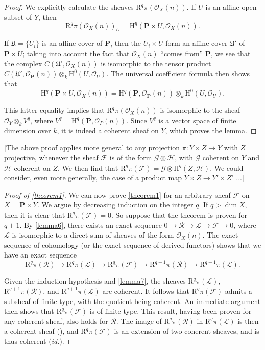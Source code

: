\documentclass{article}
\theoremstyle{plain}
\theoremstyle{definition}
\newcommand{\sh}{\mathscr}
\newcommand{\HH}{\mathrm{H}}
\newcommand{\RR}{\mathrm{R}}
\newcommand{\PP}{\mathbf{P}}
\newcommand{\oldpage}[1]{\marginpar{\footnotesize$\Big\vert$ \textit{p.~#1}}}
\begin{document}
\begin{proof}
  We explicitly calculate the sheaves $\RR^q\pi(\sh{O}_X(n))$.
  If $U$ is an affine open
  \oldpage{104}
  subset of $Y$, then
  \[
    \RR^q\pi(\sh{O}_X(n))_U = \HH^q(\PP\times U,\sh{O}_X(n)).
  \]

  If $\mathfrak{U}=\{U_i\}$ is an affine cover of $\PP$, then the $U_i\times U$ form an affine cover $\mathfrak{U}'$ of $\PP\times U$;
  taking into account the fact that $\sh{O}_X(n)$ ``comes from'' $\PP$, we see that the complex $C(\mathfrak{U}',\sh{O}_X(n))$ is isomorphic to the tensor product $C(\mathfrak{U}',\sh{O}_{\PP}(n))\otimes_k\HH^0(U,\sh{O}_U)$.
  The universal coefficient formula then shows that
  \[
    \HH^q(\PP\times U,\sh{O}_X(n)) = \HH^q(\PP,\sh{O}_{\PP}(n))\otimes_k\HH^0(U,\sh{O}_U).
  \]

  This latter equality implies that $\RR^q\pi(\sh{O}_X(n))$ is isomorphic to the sheaf $\sh{O}_Y\otimes_k V^q$, where $V^q=\HH^q(\PP,\sh{O}_P(n))$.
  Since $V^q$ is a vector space of finite dimension over $k$, it is indeed a coherent sheaf on $Y$, which proves the lemma.
\end{proof}

  [The above proof applies more general to any projection $\pi\colon Y\times Z\to Y$ with $Z$ projective, whenever the sheaf $\sh{F}$ is of the form $\sh{G}\otimes\sh{H}$, with $\sh{G}$ coherent on $Y$ and $\sh{H}$ coherent on $Z$.
  We then find that $\RR^q\pi(\sh{F})=\sh{G}\otimes\HH^q(Z,\sh{H})$.
  We could consider, even more generally, the case of a product map $Y\times Z\to Y'\times Z'$ ...]

\begin{proof}[Proof of \cref{theorem1}]
  We can now prove \cref{theorem1} for an arbitrary sheaf $\sh{F}$ on $X=\PP\times Y$.
  We argue by decreasing induction on the integer $q$.
  If $q>\dim X$, then it is clear that $\RR^q\pi(\sh{F})=0$.
  So suppose that the theorem is proven for $q+1$.
  By \cref{lemma6}, there exists an exact sequence $0\to\sh{R}\to\sh{L}\to\sh{F}\to0$, where $\sh{L}$ is isomorphic to a direct sum of sheaves of the form $\sh{O}_X(n)$.
  The exact sequence of cohomology (or the exact sequence of derived functors) shows that we have an exact sequence
  \[
    \RR^q\pi(\sh{R}) \to
    \RR^q\pi(\sh{L}) \to
    \RR^q\pi(\sh{F}) \to
    \RR^{q+1}\pi(\sh{R}) \to
    \RR^{q+1}\pi(\sh{L}).
  \]

  Given the induction hypothesis and \cref{lemma7}, the sheaves $\RR^q\pi(\sh{L})$, $\RR^{q+1}\pi(\sh{R})$, and $\RR^{q+1}\pi(\sh{L})$ are coherent.
  It follows that $\RR^q\pi(\sh{F})$ admits a subsheaf of finite type, with the quotient being coherent.
  An immediate argument then shows that $\RR^q\pi(\sh{F})$ is of finite type.
  This result, having been proven for any coherent sheaf, also holds for $\sh{R}$.
  The image of $\RR^q\pi(\sh{R})$ in $\RR^q\pi(\sh{L})$ is then a coherent sheaf (\cite[p.~208]{12}), and $\RR^q\pi(\sh{F})$ is an extension of two coherent sheaves, and is thus coherent (\emph{id.}).
\end{proof}
\end{document}

